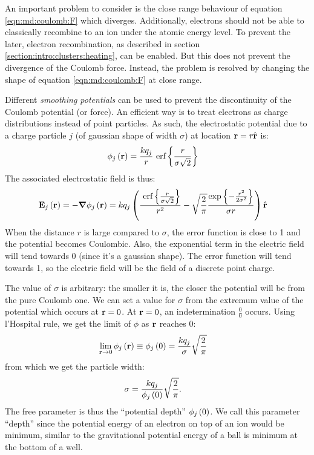 




An important problem to consider is the close range behaviour of equation
\eqref{eqn:md:coulomb:F} which diverges. Additionally, electrons should not be
able to classically recombine to an ion under the atomic energy level. To
prevent the later, electron recombination, as described in section
\ref{section:intro:clusters:heating}, can be enabled. But this does not prevent
the divergence of the Coulomb force. Instead, the problem is resolved by
changing the shape of equation \eqref{eqn:md:coulomb:F} at close range.

Different \textit{smoothing potentials} can be used to prevent the
discontinuity of the Coulomb potential (or force). An efficient way is to treat
electrons as charge distributions instead of point particles. As such, the
electrostatic potential due to a charge particle $j$ (of gaussian shape of
width $\sigma$) at location $\textbf{r} = r \hat{\textbf{r}}$ is:
\begin{align}
\phi_{j}\left( \textbf{r} \right) & = \frac{k q_j}{r} ~\textrm{erf} \left\{\frac{r}{\sigma \sqrt{2}}\right\}
\label{eqn:md:smoothed:phi}
\end{align}
The associated electrostatic field is thus:
\begin{align}
\textbf{E}_{j}\left( \textbf{r} \right) & = -\bm{\nabla} \phi_j\left( \textbf{r} \right) = k q_j \left( 
    \frac{ ~\textrm{erf} \left\{\frac{r}{\sigma\sqrt{2}}\right\} }{r^2}
    - \sqrt{\frac{2}{\pi}} \frac{ \exp{ \left\{ -\frac{r^2}{2 \sigma^2} \right\}} }{\sigma r}
 \right) \hat{\textbf{r}}
\label{eqn:md:smoothed:E}
\end{align}
When the distance $r$ is large compared to $\sigma$, the error function
is close to 1 and the potential becomes Coulombic. Also, the exponential
term in the electric field will tend towards 0 (since it's a gaussian shape).
The error function will tend towards 1, so the electric field will
be the field of a discrete point charge.

The value of $\sigma$ is arbitrary: the smaller it is, the closer the potential
will be from the pure Coulomb one. We can set a value for $\sigma$ from the
extremum value of the potential which occurs at $\textbf{r} = 0$. At $\textbf{r} = 0$, an
indetermination $\frac{0}{0}$ occurs. Using l'Hospital rule, we get the limit
of $\phi$ as $\textbf{r}$ reaches 0:
\begin{align}
\lim_{\textbf{r} \rightarrow 0} \phi_j\left( \textbf{r} \right)
    & \equiv \phi_j\left( 0 \right) = \frac{ k q_j }{ \sigma } \sqrt{\frac{2}{\pi}}
\end{align}
from which we get the particle width:
\begin{align}
\sigma & = \frac{ k q_j }{ \phi_j\left( 0 \right) } \sqrt{ \frac{2}{\pi}}.
\label{eqn:md:sigma}
\end{align}
The free parameter is thus the ``potential depth'' $\phi_j\left( 0 \right)$. We call this
parameter ``depth'' since the potential energy of an electron on top of an ion
would be minimum, similar to the gravitational potential energy of a ball is
minimum at the bottom of a well.

